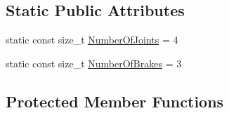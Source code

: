 \subsection*{Static Public Attributes}
\begin{DoxyCompactItemize}
\item 
static const size\-\_\-t \hyperlink{classmts_intuitive_research_kit_s_u_j_a0e6527f1c3b1aff5666599f060594c84}{Number\-Of\-Joints} = 4
\item 
static const size\-\_\-t \hyperlink{classmts_intuitive_research_kit_s_u_j_ad12679577b3110ffdb393341e793ff06}{Number\-Of\-Brakes} = 3
\end{DoxyCompactItemize}
\subsection*{Protected Member Functions}
